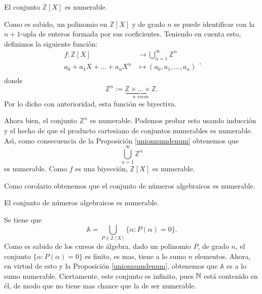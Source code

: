 \begin{lema} El conjunto $\mathbb{Z}[X]$ es numerable.
\end{lema}
\begin{demo} Como es sabido, un polinomio  en $\mathbb{Z}[X]$ y de grado $n$ se puede
identificar con la $n+1$-upla de enteros formada por sus
coeficientes. Teniendo en cuenta esto, definimos la siguiente
funci\'on:
\[\begin{split}
          f:\mathbb{Z}[X]&\longrightarrow
            \bigcup_{n=1}^{\infty}\mathbb{Z}^n\\
            a_0+a_1X+\dots+a_nX^n&\longmapsto (a_0,a_1,\dots,
            a_n)\\
            \end{split},
\]
donde
\[\mathbb{Z}^n:=\underbrace{\mathbb{Z}\times\dots\times\mathbb{Z}}_{n\,\,\text{veces}}.\]
Por lo dicho con anterioridad, esta funci\'on es biyectiva.

Ahora bien, el conjunto $\mathbb{Z}^n$ es numerable. Podemos
probar esto usando inducci\'on y el hecho de que el producto
cartesiano de conjuntos numerables es numerable. As\'{\i}, como
consecuencia de la Proposici\'on \vref{unionnumdenum} obtenemos
que
\[\bigcup_{n=1}^{\infty}\mathbb{Z}^n\]
es numerable. Como $f$ es una biyecci\'on, $\mathbb{Z}[X]$ es
numerable.
\end{demo}

Como corolario obtenemos que el conjunto de n\'umeros algebraicos
es numerable.

\begin{corolario}\label{algsonnum}
El conjunto de n\'umeros algebraicos es numerable.
\end{corolario}
\begin{demo} Se tiene que
\[\mathbb{A}=\bigcup_{P\in\mathbb{Z}[X]}\{\alpha:P(\alpha)=0\}.\]
Como es sabido de los cursos de \'algebra, dado un polinomio $P$,
de grado $n$, el conjunto $\{\alpha:P(\alpha)=0\}$ es finito, es
mas, tiene a lo sumo $n$ elementos. Ahora, en virtud de esto y la
Proposici\'on \vref{unionnumdenum}, obtenemos que $\mathbb{A}$ es
a lo sumo numerable. Ciertamente, este conjunto es infinito, pues
$\nn$ est\'a contenido en \'el, de modo que no tiene mas chance
que la de ser numerable.
\end{demo}

